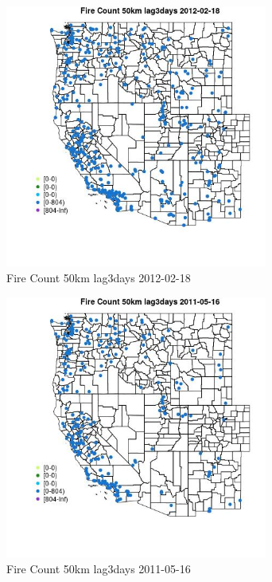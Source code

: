 \begin{figure} 
\centering  
\includegraphics[width=0.77\textwidth]{Code_Outputs/Report_ML_input_PM25_Step4_part_f_de_duplicated_aveswNAs_MapObsFire_Count_50km_lag3days2012-02-18.jpg} 
\caption{\label{fig:Report_ML_input_PM25_Step4_part_f_de_duplicated_aveswNAsMapObsFire_Count_50km_lag3days2012-02-18}Fire Count 50km lag3days 2012-02-18} 
\end{figure} 
 

\begin{figure} 
\centering  
\includegraphics[width=0.77\textwidth]{Code_Outputs/Report_ML_input_PM25_Step4_part_f_de_duplicated_aveswNAs_MapObsFire_Count_50km_lag3days2011-05-16.jpg} 
\caption{\label{fig:Report_ML_input_PM25_Step4_part_f_de_duplicated_aveswNAsMapObsFire_Count_50km_lag3days2011-05-16}Fire Count 50km lag3days 2011-05-16} 
\end{figure} 
 

